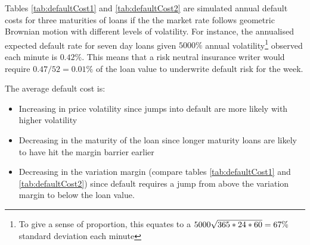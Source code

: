 \documentclass[12pt]{article}
\begin{document}
Tables \ref{tab:defaultCost1} and \ref{tab:defaultCost2} are simulated annual default costs for three maturities of loans if the the market rate follows geometric Brownian motion with different levels of volatility. For instance, the annualised expected default rate for seven day loans given $5000\%$ annual volatility\footnote{To give a sense of proportion, this equates to a $5000\/ \sqrt{365*24*60} = 67\%$ standard deviation each minute } observed each minute is $0.42\%$. This means that a risk neutral insurance writer would require $0.47/52 = 0.01\%$ of the loan value to underwrite default risk for the week.  

The average default cost is:

\begin{itemize}
\item Increasing in price volatility since jumps into default are more likely with higher volatility
\item Decreasing in the maturity of the loan since longer maturity loans are likely to have hit the margin barrier earlier
\item Decreasing in the variation margin (compare tables \ref{tab:defaultCost1} and \ref{tab:defaultCost2}) since default requires a jump from above the variation margin to below the loan value.
\end{itemize}




\singlespacing
\setlength\bibsep{0pt}





\clearpage

\onehalfspacing






\end{document}

